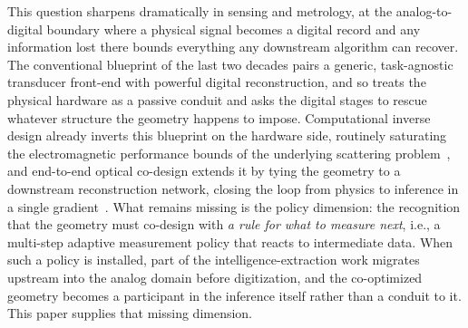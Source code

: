\documentclass[11pt,a4paper,onecolumn]{article}
\begin{document}
This question sharpens dramatically in sensing and metrology, at the analog-to-digital boundary where a physical signal becomes a digital record and any information lost there bounds everything any downstream algorithm can recover.  The conventional blueprint of the last two decades pairs a generic, task-agnostic transducer front-end with powerful digital reconstruction, and so treats the physical hardware as a passive conduit and asks the digital stages to rescue whatever structure the geometry happens to impose.  Computational inverse design already inverts this blueprint on the hardware side, routinely saturating the electromagnetic performance bounds of the underlying scattering problem~\cite{miller2016fundamental, miller2023bounds, molesky2018inverse, fan2020freeform}, and end-to-end optical co-design extends it by tying the geometry to a downstream reconstruction network, closing the loop from physics to inference in a single gradient~\cite{sitzmann2018e2e, chang2019diffractive, metzler2020deep, tseng2021metalens, kellman2019microscopy, heide2014flex, antipa2018diffusercam, arya2024endtoend, lin2021e2e, wang2018reconfigurable}.  What remains missing is the policy dimension: the recognition that the geometry must co-design with \emph{a rule for what to measure next}, i.e., a multi-step adaptive measurement policy that reacts to intermediate data.  When such a policy is installed, part of the intelligence-extraction work migrates upstream into the analog domain before digitization, and the co-optimized geometry becomes a participant in the inference itself rather than a conduit to it.  This paper supplies that missing dimension.
\end{document}
